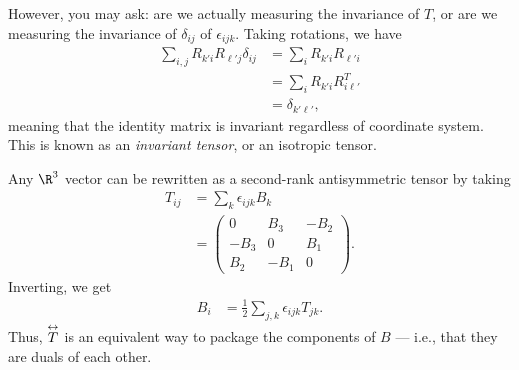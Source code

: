 \documentclass[10pt]{mypackage}
\newcommand{\doublevec}[1]{\overset{\scriptsize \leftrightarrow}{#1}}
\begin{document}
  However, you may ask: are we actually measuring the invariance of $T$, or are we measuring the invariance of $\delta_{ij}$ of $\epsilon_{ijk}$. Taking rotations, we have
  \begin{align*}
    \sum_{i,j} R_{k' i}R_{\ell' j}\delta_{ij} &= \sum_{i}R_{k'i}R_{\ell' i}\\
                                              &= \sum_{i}R_{k' i}R_{i \ell'}^{T}\\
                                              &= \delta_{k' \ell'},
  \end{align*}
  meaning that the identity matrix is invariant regardless of coordinate system. This is known as an \textit{invariant tensor}, or an isotropic tensor.
  \begin{example}
    Any $\R^3$ vector can be rewritten as a second-rank antisymmetric tensor by taking
    \begin{align*}
      T_{ij} &= \sum_{k}\epsilon_{ijk}B_k\\
             &= \begin{pmatrix}0 & B_3 & -B_2 \\ -B_3 & 0 & B_1\\B_2 & -B_1 & 0\end{pmatrix}.
    \end{align*}
    Inverting, we get
    \begin{align*}
      B_i &= \frac{1}{2}\sum_{j,k}\epsilon_{ijk}T_{jk}.
    \end{align*}
    Thus, $\doublevec{T}$ is an equivalent way to package the components of $B$ --- i.e., that they are duals of each other.
  \end{example}
  
\end{document}
